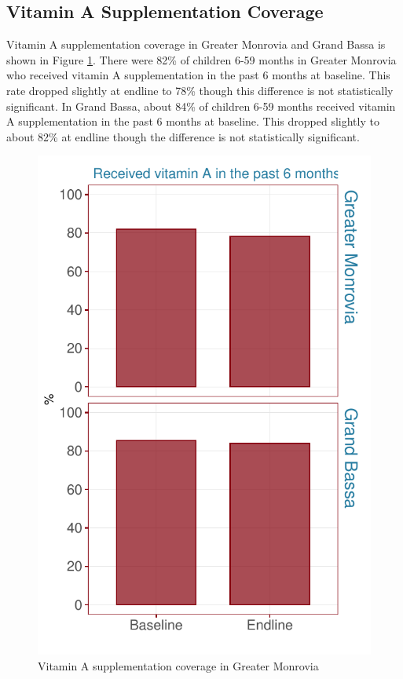 \documentclass[12pt,a4paper]{article}
\begin{document}
\hypertarget{vitamin-a-supplementation-coverage}{%
\subsection{Vitamin A Supplementation Coverage}\label{vitamin-a-supplementation-coverage}}

Vitamin A supplementation coverage in Greater Monrovia and Grand Bassa is shown in Figure \ref{fig:vit1plot}. There were 82\% of children 6-59 months in Greater Monrovia who received vitamin A supplementation in the past 6 months at baseline. This rate dropped slightly at endline to 78\% though this difference is not statistically significant. In Grand Bassa, about 84\% of children 6-59 months received vitamin A supplementation in the past 6 months at baseline. This dropped slightly to about 82\% at endline though the difference is not statistically significant.

\begin{figure}[H]

{\centering \includegraphics{liberiaCoverageFinalReport_files/figure-latex/vit1plot-1} 

}

\caption{Vitamin A supplementation coverage in Greater Monrovia}\label{fig:vit1plot}
\end{figure}
\end{document}
